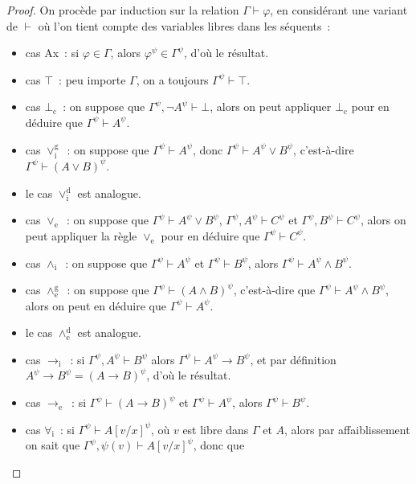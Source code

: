 \begin{proof}
  On procède par induction sur la relation $\Gamma \vdash \varphi$, en
  considérant une variant de $\vdash$ où l'on tient compte des variables libres
  dans les séquents~:
  \begin{itemize}
  \item cas Ax~: si $\varphi \in \Gamma$, alors $\varphi^\psi \in \Gamma^\psi$,
    d'où le résultat.
  \item cas $\top$~: peu importe $\Gamma$, on a toujours
    $\Gamma^\psi \vdash \top$.
  \item cas $\bot_\mathrm c$~: on suppose que
    $\Gamma^\psi, \lnot A^\psi \vdash \bot$, alors on peut appliquer
    $\bot_\mathrm c$ pour en déduire que $\Gamma^\psi \vdash A^\psi$.
  \item cas $\lor_\mathrm i^\mathrm g$~: on suppose que
    $\Gamma^\psi \vdash A^\psi$, donc $\Gamma^\psi \vdash A^\psi\lor B^\psi$,
    c'est-à-dire $\Gamma^\psi \vdash (A\lor B)^\psi$.
  \item le cas $\lor_\mathrm i^\mathrm d$ est analogue.
  \item cas $\lor_\mathrm e$~: on suppose que
    $\Gamma^\psi\vdash A^\psi\lor B^\psi$, $\Gamma^\psi, A^\psi \vdash C^\psi$ et
    $\Gamma^\psi,B^\psi\vdash C^\psi$, alors on peut appliquer la règle
    $\lor_\mathrm e$ pour en déduire que $\Gamma^\psi \vdash C^\psi$.
  \item cas $\land_\mathrm i$~: on suppose que $\Gamma^\psi\vdash A^\psi$ et
    $\Gamma^\psi \vdash B^\psi$, alors $\Gamma^\psi \vdash A^\psi \land B^\psi$.
  \item cas $\land_\mathrm e^\mathrm g$~: on suppose que
    $\Gamma^\psi\vdash (A\land B)^\psi$, c'est-à-dire que
    $\Gamma^\psi\vdash A^\psi \land B^\psi$, alors on peut en déduire que
    $\Gamma^\psi \vdash A^\psi$.
  \item le cas $\land_\mathrm e^\mathrm d$ est analogue.
  \item cas $\to_\mathrm i$~: si $\Gamma^\psi,A^\psi\vdash B^\psi$ alors
    $\Gamma^\psi\vdash A^\psi \to B^\psi$, et par définition
    $A^\psi\to B^\psi = (A\to B)^\psi$, d'où le résultat.
  \item cas $\to_\mathrm e$~: si $\Gamma^\psi \vdash (A\to B)^\psi$ et
    $\Gamma^\psi \vdash A^\psi$, alors $\Gamma^\psi\vdash B^\psi$.
  \item cas $\forall_\mathrm i$~: si $\Gamma^\psi\vdash A[v/x]^\psi$, où $v$ est
    libre dans $\Gamma$ et $A$, alors par affaiblissement on sait que
    $\Gamma^\psi, \psi(v)\vdash A[v/x]^\psi$, donc que

\end{itemize}
\end{proof}
